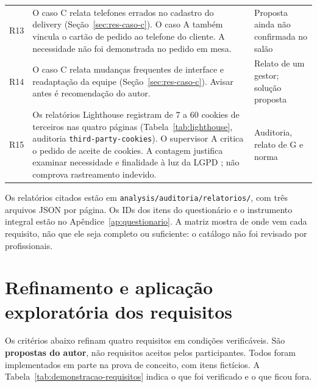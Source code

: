 \begin{longtable}{@{}p{0.9cm}p{10.0cm}p{3.0cm}@{}}
R13 & O caso C relata telefones errados no cadastro do delivery (Seção~\ref{sec:res-caso-c}). O caso A também vincula o cartão de pedido ao telefone do cliente. A necessidade não foi demonstrada no pedido em mesa. & Proposta ainda não confirmada no salão \\
R14 & O caso C relata mudanças frequentes de interface e readaptação da equipe (Seção~\ref{sec:res-caso-c}). Avisar antes é recomendação do autor. & Relato de um gestor; solução proposta \\
R15 & Os relatórios Lighthouse registram de 7 a 60 cookies de terceiros nas quatro páginas (Tabela~\ref{tab:lighthouse}, auditoria \texttt{third-party-cookies}). O supervisor A critica o pedido de aceite de cookies. A contagem justifica examinar necessidade e finalidade à luz da LGPD \cite{martins2021principiologia}; não comprova rastreamento indevido. & Auditoria, relato de G e norma \\
\bottomrule
\end{longtable}

Os relatórios citados estão em \texttt{analysis/\allowbreak auditoria/\allowbreak relatorios/}, com três arquivos JSON por página. Os IDs dos itens do questionário e o instrumento integral estão no Apêndice~\ref{ap:questionario}. A matriz mostra de onde vem cada requisito, não que ele seja completo ou suficiente: o catálogo não foi revisado por profissionais.

\section{Refinamento e aplicação exploratória dos requisitos}
\label{sec:requisitos-aplicacao}

Os critérios abaixo refinam quatro requisitos em condições verificáveis. São \textbf{propostas do autor}, não requisitos aceitos pelos participantes. Todos foram implementados em parte na prova de conceito, com itens fictícios. A Tabela~\ref{tab:demonstracao-requisitos} indica o que foi verificado e o que ficou fora.

